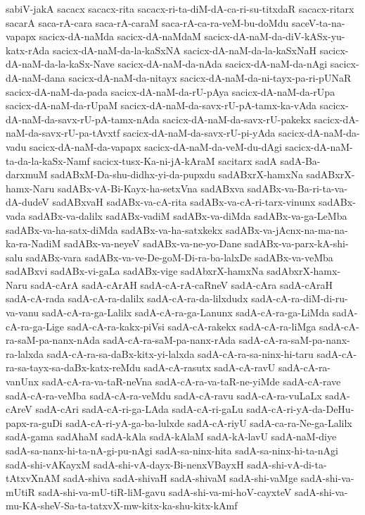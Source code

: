 {sabiV-jakA
sacacx
sacacx-rita
sacacx-ri-ta-diM-dA-ca-ri-su-titxdaR
sacacx-ritarx
sacarA
saca-rA-cara
saca-rA-caraM
saca-rA-ca-ra-veM-bu-doMdu
saceV-ta-na-vapapx
sacicx-dA-naMda
sacicx-dA-naMdaM
sacicx-dA-naM-da-diV-kASx-yu-katx-rAda
sacicx-dA-naM-da-la-kaSxNA
sacicx-dA-naM-da-la-kaSxNaH
sacicx-dA-naM-da-la-kaSx-Nave
sacicx-dA-naM-da-nAda
sacicx-dA-naM-da-nAgi
sacicx-dA-naM-dana
sacicx-dA-naM-da-nitayx
sacicx-dA-naM-da-ni-tayx-pa-ri-pUNaR
sacicx-dA-naM-da-pada
sacicx-dA-naM-da-rU-pAya
sacicx-dA-naM-da-rUpa
sacicx-dA-naM-da-rUpaM
sacicx-dA-naM-da-savx-rU-pA-tamx-ka-vAda
sacicx-dA-naM-da-savx-rU-pA-tamx-nAda
sacicx-dA-naM-da-savx-rU-pakekx
sacicx-dA-naM-da-savx-rU-pa-tAvxtf
sacicx-dA-naM-da-savx-rU-pi-yAda
sacicx-dA-naM-da-vadu
sacicx-dA-naM-da-vapapx
sacicx-dA-naM-da-veM-du-dAgi
sacicx-dA-naM-ta-da-la-kaSx-Namf
sacicx-tusx-Ka-ni-jA-kAraM
sacitarx
sadA
sadA-Ba-darxmuM
sadABxM-Da-shu-didhx-yi-da-pupxdu
sadABxrX-hamxNa
sadABxrX-hamx-Naru
sadABx-vA-Bi-Kayx-ha-setxVna
sadABxva
sadABx-va-Ba-ri-ta-va-dA-dudeV
sadABxvaH
sadABx-va-cA-rita
sadABx-va-cA-ri-tarx-vinunx
sadABx-vada
sadABx-va-dalilx
sadABx-vadiM
sadABx-va-diMda
sadABx-va-ga-LeMba
sadABx-va-ha-satx-diMda
sadABx-va-ha-satxkekx
sadABx-va-jAcnx-na-ma-na-ka-ra-NadiM
sadABx-va-neyeV
sadABx-va-ne-yo-Dane
sadABx-va-parx-kA-shi-salu
sadABx-vara
sadABx-va-ve-De-goM-Di-ra-ba-lalxDe
sadABx-va-veMba
sadABxvi
sadABx-vi-gaLa
sadABx-vige
sadAbxrX-hamxNa
sadAbxrX-hamx-Naru
sadA-cArA
sadA-cArAH
sadA-cA-rA-caRneV
sadA-cAra
sadA-cAraH
sadA-cA-rada
sadA-cA-ra-dalilx
sadA-cA-ra-da-lilxdudx
sadA-cA-ra-diM-di-ru-va-vanu
sadA-cA-ra-ga-Lalilx
sadA-cA-ra-ga-Lanunx
sadA-cA-ra-ga-LiMda
sadA-cA-ra-ga-Lige
sadA-cA-ra-kakx-piVsi
sadA-cA-rakekx
sadA-cA-ra-liMga
sadA-cA-ra-saM-pa-nanx-nAda
sadA-cA-ra-saM-pa-nanx-rAda
sadA-cA-ra-saM-pa-nanx-ra-lalxda
sadA-cA-ra-sa-daBx-kitx-yi-lalxda
sadA-cA-ra-sa-ninx-hi-taru
sadA-cA-ra-sa-tayx-sa-daBx-katx-reMdu
sadA-cA-rasutx
sadA-cA-ravU
sadA-cA-ra-vanUnx
sadA-cA-ra-va-taR-neVna
sadA-cA-ra-va-taR-ne-yiMde
sadA-cA-rave
sadA-cA-ra-veMba
sadA-cA-ra-veMdu
sadA-cA-ravu
sadA-cA-ra-vuLaLx
sadA-cAreV
sadA-cAri
sadA-cA-ri-ga-LAda
sadA-cA-ri-gaLu
sadA-cA-ri-yA-da-DeHu-papx-ra-guDi
sadA-cA-ri-yA-ga-ba-lulxde
sadA-cA-riyU
sadA-ca-ra-Ne-ga-Lalilx
sadA-gama
sadAhaM
sadA-kAla
sadA-kAlaM
sadA-kA-lavU
sadA-naM-diye
sadA-sa-nanx-hi-ta-nA-gi-pu-nAgi
sadA-sa-ninx-hita
sadA-sa-ninx-hi-ta-nAgi
sadA-shi-vAKayxM
sadA-shi-vA-dayx-Bi-nenxVBayxH
sadA-shi-vA-di-ta-tAtxvXnAM
sadA-shiva
sadA-shivaH
sadA-shivaM
sadA-shi-vaMge
sadA-shi-va-mUtiR
sadA-shi-va-mU-tiR-liM-gavu
sadA-shi-va-mi-hoV-cayxteV
sadA-shi-va-mu-KA-sheV-Sa-ta-tatxvX-mw-kitx-ka-shu-kitx-kAmf
}
